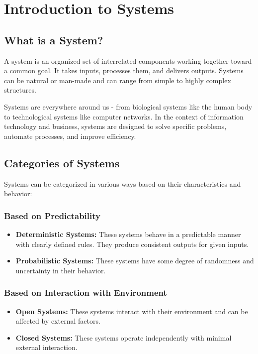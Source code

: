 \documentclass[12pt,a4paper]{article}
\begin{document}
\pagestyle{reportstyle}
\newpage


\section{Introduction to Systems}

\subsection{What is a System?}
A system is an organized set of interrelated components working together toward a common goal. It takes inputs, processes them, and delivers outputs. Systems can be natural or man-made and can range from simple to highly complex structures.

Systems are everywhere around us - from biological systems like the human body to technological systems like computer networks. In the context of information technology and business, systems are designed to solve specific problems, automate processes, and improve efficiency.

\subsection{Categories of Systems}

Systems can be categorized in various ways based on their characteristics and behavior:

\subsubsection{Based on Predictability}
\begin{itemize}
    \item \textbf{Deterministic Systems:} These systems behave in a predictable manner with clearly defined rules. They produce consistent outputs for given inputs.
    \item \textbf{Probabilistic Systems:} These systems have some degree of randomness and uncertainty in their behavior.
\end{itemize}

\subsubsection{Based on Interaction with Environment}
\begin{itemize}
    \item \textbf{Open Systems:} These systems interact with their environment and can be affected by external factors.
    \item \textbf{Closed Systems:} These systems operate independently with minimal external interaction.
\end{itemize}
\end{document}
